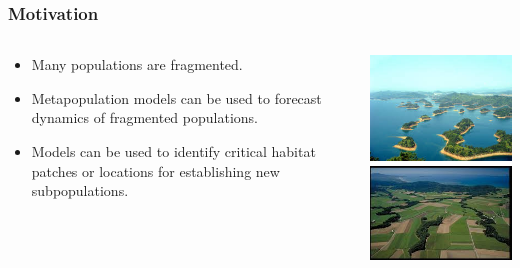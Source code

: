 \documentclass[color=usenames,dvipsnames]{beamer}\usepackage[]{graphicx}\usepackage[]{color}
\begin{document}
\begin{frame}
  \frametitle{Motivation}
  \large
  \begin{columns}
    \begin{column}{0.6\textwidth}
      \begin{itemize}[<+->]
        \item Many populations are fragmented.
        \item Metapopulation models can be used to forecast dynamics of
          fragmented populations.
        \item Models can be used to identify critical habitat patches or
          locations for establishing new subpopulations.
      \end{itemize}
    \end{column}
    \begin{column}{0.4\textwidth}
      \includegraphics[width=\textwidth]{figs/ping-ding} \\
      \vspace{1cm}
      \includegraphics[width=\textwidth]{figs/fragmentation} \par
    \end{column}
  \end{columns}
\end{frame}
\end{document}
